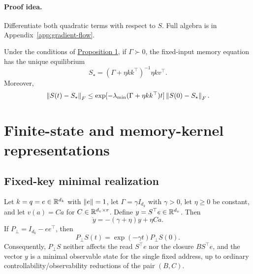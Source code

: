 \paragraph{Proof idea.}
Differentiate both quadratic terms with respect to $S$. Full algebra is in
Appendix~\ref{app:gradient-flow}.

\label{cor:fixed-equilibrium}
\begin{corollarytwo}
Under the conditions of \hyperref[prop:gradient-flow]{Proposition 1}, if
$\Gamma\succ0$, the fixed-input memory equation has the unique equilibrium
\begin{equation}
 S_\star=(\Gamma+\eta kk^\top)^{-1}\eta kv^\top.
 \label{eq:memory-equilibrium}
\end{equation}
Moreover,
\begin{equation}
 \left\lVert S(t)-S_\star\right\rVert_F
 \le
 \exp[-\lambda_{\min}(\Gamma+\eta kk^\top)t]
 \left\lVert S(0)-S_\star\right\rVert_F.
 \label{eq:equilibrium-convergence}
\end{equation}
\end{corollarytwo}

\section{Finite-state and memory-kernel representations}
\label{sec:finite-state}

\subsection{Fixed-key minimal realization}
\label{sec:fixed-key}

\label{prop:fixed-key}
\begin{propositionthree}
Let $k=q=e\in\mathbb{R}^{d_k}$ with $\left\lVert e\right\rVert=1$, let
$\Gamma=\gamma I_{d_k}$ with $\gamma>0$, let $\eta\ge0$ be constant, and
let $v(a)=Ca$ for $C\in\mathbb{R}^{d_v\times r}$. Define
$y=S^\top e\in\mathbb{R}^{d_v}$. Then
\begin{equation}
 \dot y=-(\gamma+\eta)y+\eta Ca.
 \label{eq:fixed-key-vector}
\end{equation}
If $P_\perp=I_{d_k}-ee^\top$, then
\begin{equation}
 P_\perp S(t)=\exp(-\gamma t)P_\perp S(0).
 \label{eq:orthogonal-decay}
\end{equation}
Consequently, $P_\perp S$ neither affects the read $S^\top e$ nor the
closure $BS^\top e$, and the vector $y$ is a minimal observable state for
the single fixed address, up to ordinary controllability/observability
reductions of the pair $(B,C)$.
\end{propositionthree}

